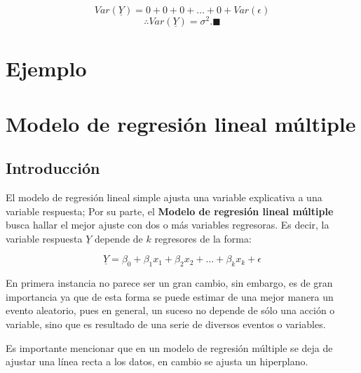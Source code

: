 \documentclass[a4paper,oneside,openany]{book}
\newenvironment{Shaded}{\begin{snugshade}}{\end{snugshade}}
\newcommand{\KeywordTok}[1]{\textcolor[rgb]{0.13,0.29,0.53}{\textbf{#1}}}
\newcommand{\DataTypeTok}[1]{\textcolor[rgb]{0.13,0.29,0.53}{#1}}
\newcommand{\DecValTok}[1]{\textcolor[rgb]{0.00,0.00,0.81}{#1}}
\newcommand{\StringTok}[1]{\textcolor[rgb]{0.31,0.60,0.02}{#1}}
\newcommand{\OperatorTok}[1]{\textcolor[rgb]{0.81,0.36,0.00}{\textbf{#1}}}
\newcommand{\NormalTok}[1]{#1}
\begin{document}
\[Var(\underline{Y})=0+0+0+\ldots+0+Var(\epsilon)\]
\[\therefore Var(\underline{Y})=\sigma^2.\blacksquare\]

\chapter{Ejemplo}\label{ejemplo-19}

\chapter{Modelo de regresión lineal
múltiple}\label{modelo-de-regresiuxf3n-lineal-muxfaltiple}

\section{Introducción}\label{introducciuxf3n}

El modelo de regresión lineal simple ajusta una variable explicativa a
una variable respuesta; Por su parte, el \textbf{Modelo de regresión
lineal múltiple} busca hallar el mejor ajuste con dos o más variables
regresoras. Es decir, la variable respuesta \(\underline{Y}\) depende de
\(k\) regresores de la forma:

\[
\begin{equation*}
\underline{Y}=\beta_{0}+\beta_{1}x_{1}+\beta_{2}x_{2}+ \ldots +\beta_{k}x_{k}+\epsilon
\end{equation*}\]

En primera instancia no parece ser un gran cambio, sin embargo, es de
gran importancia ya que de esta forma se puede estimar de una mejor
manera un evento aleatorio, pues en general, un suceso no depende de
sólo una acción o variable, sino que es resultado de una serie de
diversos eventos o variables.

Es importante mencionar que en un modelo de regresión múltiple se deja
de ajustar una línea recta a los datos, en cambio se ajusta un
hiperplano.

\begin{Shaded}
\end{Shaded}
\end{document}
